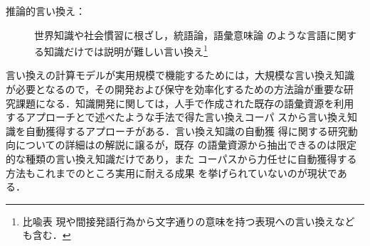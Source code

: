 \begin{description}
\item[推論的言い換え：] 世界知識や社会慣習に根ざし，統語論，語彙意味論
  のような言語に関する知識だけでは説明が難しい言い換え\footnote{比喩表
    現や間接発語行為から文字通りの意味を持つ表現への言い換えなども含む．}
\end{description}

言い換えの計算モデルが実用規模で機能するためには，大規模な言い換え知識
が必要となるので，その開発および保守を効率化するための方法論が重要な研
究課題になる．知識開発に関しては，人手で作成された既存の語彙資源を利用
するアプローチとで述べたような手法で得た言い換えコーパ
スから言い換え知識を自動獲得するアプローチがある．言い換え知識の自動獲
得に関する研究動向についての詳細はの解説に譲るが，既存
の語彙資源から抽出できるのは限定的な種類の言い換え知識だけであり，また
コーパスから力任せに自動獲得する方法もこれまでのところ実用に耐える成果
を挙げられていないのが現状である．

